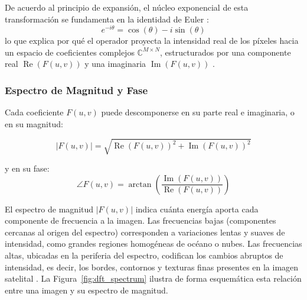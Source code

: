 \documentclass[conference]{IEEEtran}
\begin{document}
De acuerdo al principio de expansión, el núcleo exponencial de esta transformación se fundamenta en la identidad de Euler \cite{castillo2018filtrado}:
\begin{equation}
e^{-i \theta} = \cos(\theta) - i\sin(\theta)
\end{equation}
lo que explica por qué el operador proyecta la intensidad real de los píxeles hacia un espacio de coeficientes complejos $\mathbb{C}^{M \times N}$, estructurados por una componente real $\operatorname{Re}(F(u,v))$ y una imaginaria $\operatorname{Im}(F(u,v))$ \cite{gonzalez2018}.

\subsubsection{Espectro de Magnitud y Fase}

Cada coeficiente $F(u, v)$ puede descomponerse en su parte real e imaginaria, o en su magnitud:

\begin{equation}
    |F(u,v)| = \sqrt{\operatorname{Re}(F(u,v))^2 + \operatorname{Im}(F(u,v))^2}
    \label{eq:magnitud}
\end{equation}

y en su fase:
\begin{equation}
    \angle F(u,v) = \arctan\!\left(\frac{\operatorname{Im}(F(u,v))}
                                        {\operatorname{Re}(F(u,v))}\right)
    \label{eq:fase}
\end{equation}

El espectro de magnitud $|F(u,v)|$ indica cuánta energía aporta cada componente
de frecuencia a la imagen. Las frecuencias bajas (componentes cercanas al
origen del espectro) corresponden a variaciones lentas y suaves de intensidad,
como grandes regiones homogéneas de océano o nubes. Las frecuencias altas,
ubicadas en la periferia del espectro, codifican los cambios abruptos de
intensidad, es decir, los bordes, contornos y texturas finas presentes en la imagen satelital \cite{gonzalez2018}. La Figura~\ref{fig:dft_spectrum} ilustra
de forma esquemática esta relación entre una imagen y su espectro de magnitud.
\end{document}
